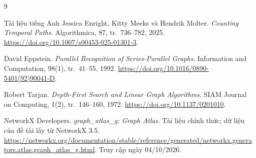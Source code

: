 \begin{thebibliography}{9}
\begin{bibsection}{Tài liệu tiếng Anh}
Jessica Enright, Kitty Meeks và Hendrik Molter.
\textit{Counting Temporal Paths}. Algorithmica, 87, tr.~736--782, 2025.
\url{https://doi.org/10.1007/s00453-025-01301-3}.

David Eppstein. \textit{Parallel Recognition of Series-Parallel Graphs}.
Information and Computation, 98(1), tr.~41--55, 1992.
\url{https://doi.org/10.1016/0890-5401(92)90041-D}.

Robert Tarjan. \textit{Depth-First Search and Linear Graph Algorithms}.
SIAM Journal on Computing, 1(2), tr.~146--160, 1972.
\url{https://doi.org/10.1137/0201010}.

NetworkX Developers. \textit{graph\_atlas\_g: Graph Atlas}.
Tài liệu chính thức; dữ liệu của đề tài lấy từ NetworkX 3.5.
\url{https://networkx.org/documentation/stable/reference/generated/networkx.generators.atlas.graph_atlas_g.html}.
Truy cập ngày 04/10/2026.
\end{bibsection}
\end{thebibliography}
